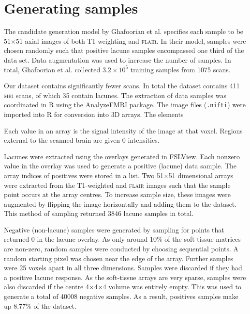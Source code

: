 

\section{Generating samples}\label{data-samples}

The candidate generation model by Ghafoorian et al. \cite{GhafoorianM.2017Dml3} specifies each sample to be 51$\times$51 axial images of both T1-weighting and \textsc{flair}. In their model, samples were chosen randomly such that positive lacune samples encompassed one third of the data set. Data augmentation was used to increase the number of samples. In total, Ghafoorian et al. collected $3.2\times10^5$ training samples from 1075 scans.

Our dataset contains significantly fewer scans. In total the dataset contains 411 \textsc{mri} scans, of which 35 contain lacunes. The extraction of data samples was coordinated in R using the AnalyzeFMRI package. The image files (\texttt{.nifti}) were imported into R for conversion into 3D arrays. The elements

Each value in an array is the signal intensity of the image at that voxel. Regions external to the scanned brain are given 0 intensities.

Lacunes were extracted using the overlays generated in FSLView. Each nonzero value in the overlay was used to generate a positive (lacune) data sample. The array indices of positives were stored in a list. Two 51$\times$51 dimensional arrays were extracted from the T1-weighted and \textsc{flair} images such that the sample point occurs at the array centres. To increase sample size, these images were augmented by flipping the image horizontally and adding them to the dataset. This method of sampling returned 3846 lacune samples in total.


Negative (non-lacune) samples were generated by sampling for points that returned 0 in the lacune overlay. As only around 10\% of the soft-tissue matrices are non-zero, random samples were conducted by choosing sequential points. A random starting pixel was chosen near the edge of the array. Further samples were 25 voxels apart in all three dimensions. Samples were discarded if they had a positive lacune response. As the soft-tissue arrays are very sparse, samples were also discarded if the centre 4$\times$4$\times$4 volume was entirely empty. This was used to generate a total of 40008 negative samples. As a result, positives samples make up 8.77\% of the dataset.

